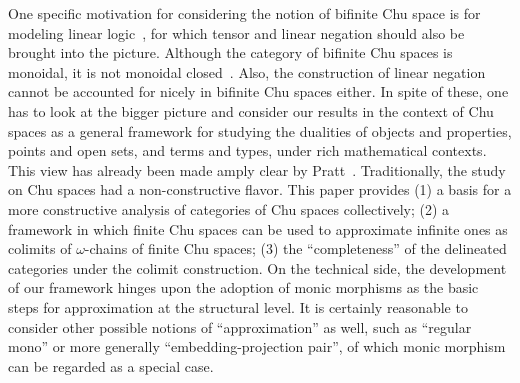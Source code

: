 \documentclass{LMCS}
\begin{document}
\noindent One specific motivation for considering the notion of
bifinite Chu space is for modeling linear logic~\cite{lamarche0}, for
which tensor and linear negation should also be brought into the
picture.  Although the category of bifinite Chu spaces is monoidal, it
is not monoidal closed~\cite{huang}.  Also, the construction of linear
negation cannot be accounted for nicely in bifinite Chu spaces either.
In spite of these, one has to look at the bigger picture and consider
our results in the context of Chu spaces as a general framework for
studying the dualities of objects and properties, points and open
sets, and terms and types, under rich mathematical contexts. This view
has already been made amply clear by
Pratt~\cite{pratt1,pratt2,pratt3,pratt4,pratt5,pratt6,pratt7}.
Traditionally, the study on Chu spaces had a non-constructive
flavor. This paper provides (1) a basis for a more constructive
analysis of categories of Chu spaces collectively; (2) a framework in
which finite Chu spaces can be used to approximate infinite ones as
colimits of $\omega$-chains of finite Chu spaces; (3) the
``completeness'' of the delineated categories under the colimit
construction.  On the technical side, the development of our framework
hinges upon the adoption of monic morphisms as the basic steps for
approximation at the structural level.  It is certainly reasonable to
consider other possible notions of ``approximation'' as well, such as
``regular mono'' or more generally ``embedding-projection pair'', of
which monic morphism can be regarded as a special case.
\end{document}
